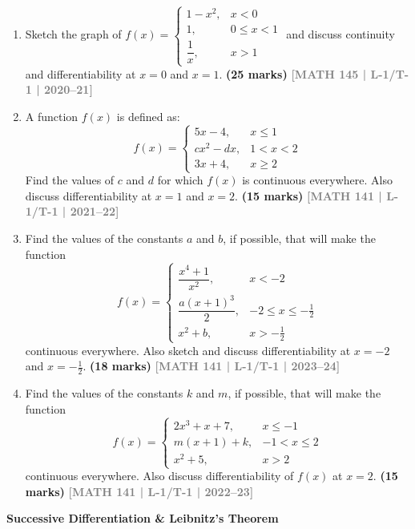 \documentclass[12pt,a4paper]{article}
\newcommand{\yr}[1]{\hfill\textcolor{gray}{\small\textbf{[#1]}}}
\newcommand{\mk}[1]{\textcolor{orange!70!black}{\small\textbf{(#1 marks)}}}
\newcommand{\subtopic}[2]{%
  \vspace{10pt}
  \noindent\begin{tcolorbox}[colback=#1!8,colframe=#1,boxrule=0.6pt,arc=4pt,
    left=6pt,right=6pt,top=4pt,bottom=4pt]
    \small\bfseries\textcolor{#1}{#2}
  \end{tcolorbox}
  \vspace{2pt}
}
\begin{document}
\begin{enumerate}
\item Sketch the graph of $f(x)=\begin{cases}1-x^{2}, & x<0\\ 1, & 0\le x<1\\ \dfrac{1}{x}, & x>1\end{cases}$ and discuss continuity and differentiability at $x=0$ and $x=1$.
\mk{25} \yr{MATH 145 | L-1/T-1 | 2020--21}

\item A function $f(x)$ is defined as:
\[
f(x)=\begin{cases}5x-4, & x\le 1\\ cx^{2}-dx, & 1<x<2\\ 3x+4, & x\ge 2\end{cases}
\]
Find the values of $c$ and $d$ for which $f(x)$ is continuous everywhere. Also discuss differentiability at $x=1$ and $x=2$.
\mk{15} \yr{MATH 141 | L-1/T-1 | 2021--22}

\item Find the values of the constants $a$ and $b$, if possible, that will make the function
\[
f(x)=\begin{cases}\dfrac{x^{4}+1}{x^{2}}, & x<-2\\[6pt] \dfrac{a(x+1)^{3}}{2}, & -2\le x\le-\tfrac{1}{2}\\[6pt] x^{2}+b, & x>-\tfrac{1}{2}\end{cases}
\]
continuous everywhere. Also sketch and discuss differentiability at $x=-2$ and $x=-\tfrac{1}{2}$.
\mk{18} \yr{MATH 141 | L-1/T-1 | 2023--24}

\item Find the values of the constants $k$ and $m$, if possible, that will make the function
\[
f(x)=\begin{cases}2x^{3}+x+7, & x\le -1\\ m(x+1)+k, & -1<x\le 2\\ x^{2}+5, & x>2\end{cases}
\]
continuous everywhere. Also discuss differentiability of $f(x)$ at $x=2$.
\mk{15} \yr{MATH 141 | L-1/T-1 | 2022--23}



\end{enumerate}

\subtopic{cA}{Successive Differentiation \& Leibnitz's Theorem}
\label{sub:s1-succ}
\end{document}
